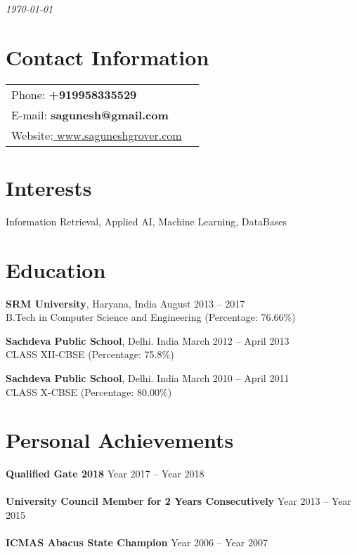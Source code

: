 \documentclass[margin,line]{res}
\begin{document}
 \hfill {\em \today}

\begin{resume}
\section{\sc Contact Information}

\vspace{.05in}
\begin{tabular}{@{}p{3.5in}p{3in}}
{ Phone:} \bf +919958335529 \\
 {E-mail:} \bf  sagunesh@gmail.com\\
 {Website:}\url{ www.saguneshgrover.com}
\end{tabular}


\section{\sc Interests}

Information Retrieval, Applied AI, Machine Learning, DataBases

\section{\sc Education}
{\bf SRM University}, Haryana, India \hfill August 2013 -- 2017\\
B.Tech in Computer Science and Engineering \hfill(Percentage: 76.66\%)

{\bf Sachdeva Public School}, Delhi. India \hfill March 2012 -- April 2013\\
CLASS XII-CBSE \hfill(Percentage: 75.8\%)

{\bf Sachdeva Public School}, Delhi. India \hfill March 2010 -- April 2011\\
CLASS X-CBSE \hfill(Percentage: 80.00\%)

\section{\sc Personal Achievements}
{\bf Qualified Gate 2018} \hfill Year 2017 -- Year 2018 \\\\
{\bf University Council Member for 2 Years Consecutively} \hfill Year 2013 --  Year 2015\\\\
{\bf ICMAS Abacus State Champion} \hfill Year 2006 --  Year 2007\\\\


\end{resume}
\end{document}
